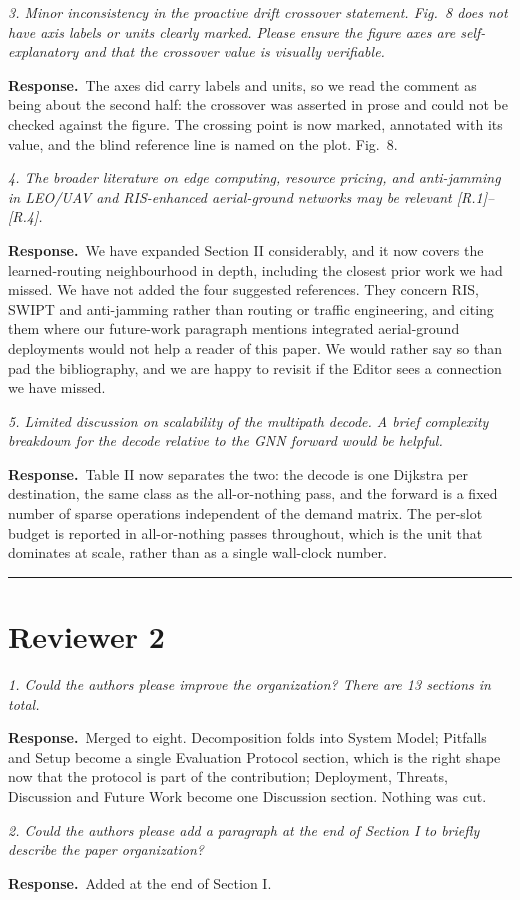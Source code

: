 \documentclass[11pt]{article}
\newcommand{\rc}[1]{\medskip\noindent\textit{\textcolor{black!65}{#1}}\par\smallskip}
\newcommand{\ans}{\noindent\textbf{Response.}\ }
\begin{document}
\rc{3. Minor inconsistency in the proactive drift crossover statement. Fig.\ 8 does not have axis
labels or units clearly marked. Please ensure the figure axes are self-explanatory and that the
crossover value is visually verifiable.}
\ans The axes did carry labels and units, so we read the comment as being about the second half:
the crossover was asserted in prose and could not be checked against the figure. The crossing point
is now marked, annotated with its value, and the blind reference line is named on the plot. Fig.\ 8.

\rc{4. The broader literature on edge computing, resource pricing, and anti-jamming in LEO/UAV and
RIS-enhanced aerial-ground networks may be relevant [R.1]--[R.4].}
\ans We have expanded Section II considerably, and it now covers the learned-routing neighbourhood
in depth, including the closest prior work we had missed. We have not added the four suggested
references. They concern RIS, SWIPT and anti-jamming rather than routing or traffic engineering,
and citing them where our future-work paragraph mentions integrated aerial-ground deployments would
not help a reader of this paper. We would rather say so than pad the bibliography, and we are happy
to revisit if the Editor sees a connection we have missed.

\rc{5. Limited discussion on scalability of the multipath decode. A brief complexity breakdown for
the decode relative to the GNN forward would be helpful.}
\ans Table II now separates the two: the decode is one Dijkstra per destination, the same class as
the all-or-nothing pass, and the forward is a fixed number of sparse operations independent of the
demand matrix. The per-slot budget is reported in all-or-nothing passes throughout, which is the
unit that dominates at scale, rather than as a single wall-clock number.

\hrule
\section*{Reviewer 2}

\rc{1. Could the authors please improve the organization? There are 13 sections in total.}
\ans Merged to eight. Decomposition folds into System Model; Pitfalls and Setup become a single
Evaluation Protocol section, which is the right shape now that the protocol is part of the
contribution; Deployment, Threats, Discussion and Future Work become one Discussion section.
Nothing was cut.

\rc{2. Could the authors please add a paragraph at the end of Section I to briefly describe the
paper organization?}
\ans Added at the end of Section I.
\end{document}

